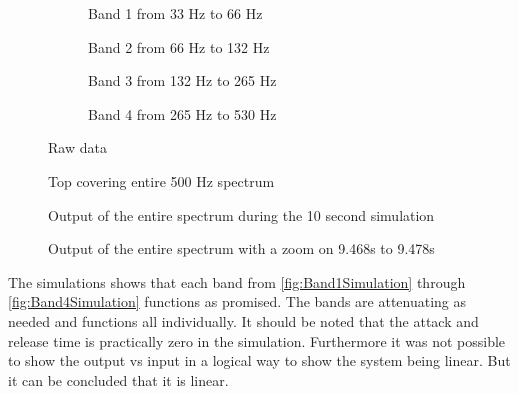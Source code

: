 \begin{figure}[H]
\centering
\begin{subfigure}[t]{0.49\textwidth}
    \centering
    
    \caption{Band 1 from 33 Hz to 66 Hz}
    \label{fig:Band1Simulation}
\end{subfigure}
\begin{subfigure}[t]{0.49\textwidth}
    \centering
    
    \caption{Band 2 from 66 Hz to 132 Hz}
    \label{fig:Band2Simulation}
\end{subfigure}
\begin{subfigure}[t]{0.49\textwidth}
    \centering
    
    \caption{Band 3 from 132 Hz to 265 Hz}
    \label{fig:Band3Simulation}
\end{subfigure}
\begin{subfigure}[t]{0.49\textwidth}
    \centering
    
    \caption{Band 4 from 265 Hz to 530 Hz}
    \label{fig:Band4Simulation}
\end{subfigure}
\caption{Raw data}
\label{fig:SimulationComparisson}
\end{figure} 

\begin{figure}
    \centering
    
    \caption{Top covering entire 500 Hz spectrum}
    \label{fig:BandTopSimulation}
\end{figure}


\begin{figure}
	\centering
	
	\caption{Output of the entire spectrum during the 10 second simulation}
	\label{fig:TotalOutputSimulation}
\end{figure}

\begin{figure}
	\centering
	
	\caption{Output of the entire spectrum with a zoom on 9.468s to 9.478s}
	\label{fig:TotalOutputZoomSimulation}
\end{figure}


The simulations shows that each band from \autoref{fig:Band1Simulation} through \autoref{fig:Band4Simulation} functions as promised. The bands are attenuating as needed and functions all individually. It should be noted that the attack and release time is practically zero in the simulation. Furthermore it was not possible to show the output vs input in a logical way to show the system being linear. But it can be concluded that it is linear.


 




